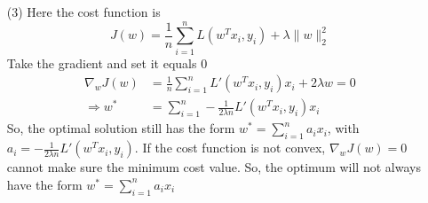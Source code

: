 \documentclass[a4paper,12pt]{article}
\begin{document}
\begin{itemize}
\clearpage
\item[(3)]
Here the cost function is 
$$
J(w) = \frac{1}{n} \sum_{i=1}^n L(w^T x_i,y_i) + \lambda \| w\|_2^2
$$
Take the gradient and set it equals 0
\begin{align*}
\nabla_w J(w) &= \frac{1}{n} \sum_{i=1}^n L' (w^T x_i,y_i) x_i  + 2 \lambda w = 0 \\
\Rightarrow w^* &= \sum_{i=1}^n -\frac{1}{2 \lambda n} L' (w^T x_i,y_i) x_i
\end{align*}
So, the optimal solution still has the form $w^* =\sum_{i=1}^n a_i x_i$, with $a_i = -\frac{1}{2 \lambda n} L' (w^T x_i,y_i)$. If the cost function is not convex, $\nabla_w J(w) =0$ cannot make sure the minimum cost value. So, the optimum will not always have the form $w^* =\sum_{i=1}^n a_i x_i$
\end{itemize}





\clearpage
\end{document}
